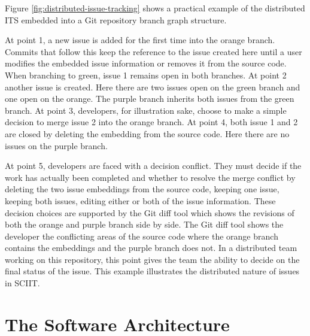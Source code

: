 \documentclass{mproj}
\begin{document}
Figure \ref{fig:distributed-issue-tracking} shows a practical example of the distributed ITS embedded into a Git repository branch graph structure. 

At point 1, a new issue is added for the first time into the orange branch. Commits that follow this keep the reference to the issue created here until a user modifies the embedded issue information or removes it from the source code. When branching to green, issue 1 remains open in both branches. At point 2 another issue is created. Here there are two issues open on the green branch and one open on the orange. The purple branch inherits both issues from the green branch. At point 3, developers, for illustration sake, choose to make a simple decision to merge issue 2 into the orange branch. At point 4, both issue 1 and 2 are closed by deleting the embedding from the source code. Here there are no issues on the purple branch. 

At point 5, developers are faced with a decision conflict. They must decide if the work has actually been completed and whether to resolve the merge conflict by deleting the two issue embeddings from the source code, keeping one issue, keeping both issues, editing either or both of the issue information. These decision choices are supported by the Git diff tool which shows the revisions of both the orange and purple branch side by side. The Git diff tool shows the developer the conflicting areas of the source code where the orange branch contains the embeddings and the purple branch does not. In a distributed team working on this repository, this point gives the team the ability to decide on the final status of the issue. This example illustrates the distributed nature of issues in SCIIT.


\section{The Software Architecture}
\end{document}
